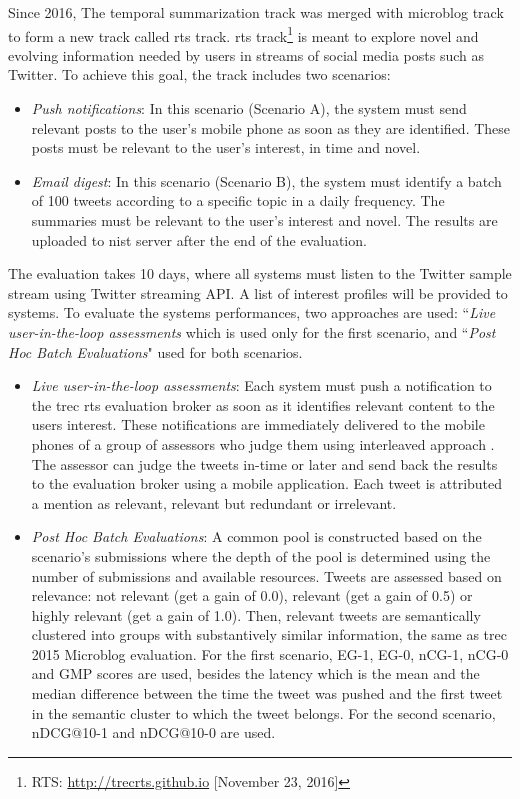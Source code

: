 Since 2016, The temporal summarization track was merged with microblog track to form a new track called \ac{rts} track.
\ac{rts} track\footnote{RTS: \url{http://trecrts.github.io} [November 23, 2016]} is meant to explore novel and evolving information needed by users in streams of social media posts such as Twitter.
To achieve this goal, the track includes two scenarios:
\begin{itemize}
	\item \textit{Push notifications}: 
	In this scenario (Scenario A), the system must send relevant posts to the user's mobile phone as soon as they are identified. 
	These posts must be relevant to the user's interest, in time and novel.
	
	\item \textit{Email digest}:
	In this scenario (Scenario B), the system must identify a batch of 100 tweets according to a specific topic in a daily frequency.
	The summaries must be relevant to the user's interest and novel.
	The results are uploaded to \ac{nist} server after the end of the evaluation.
\end{itemize}
%
The evaluation takes 10 days, where all systems must listen to the Twitter sample stream using Twitter streaming API. 
A list of interest profiles will be provided to systems.
To evaluate the systems performances, two approaches are used: ``\textit{Live user-in-the-loop assessments} which is used only for the first scenario, and ``\textit{Post Hoc Batch Evaluations}" used for both scenarios.
\begin{itemize}
	\item \textit{Live user-in-the-loop assessments}: 
	Each system must push a notification to the \ac{trec} \ac{rts} evaluation broker as soon as it identifies relevant content to the users interest. 
	These notifications are immediately delivered to the mobile phones of a group of assessors who judge them using interleaved approach \citep{16-qian-al}.
	The assessor can judge the tweets in-time or later and send back the results to the evaluation broker using a mobile application.
	Each tweet is attributed a mention as relevant, relevant but redundant or irrelevant.
	
	\item \textit{Post Hoc Batch Evaluations}:
	A common pool is constructed based on the scenario's submissions where the depth of the pool is determined using the number of submissions and available resources.
	Tweets are assessed based on relevance: not relevant (get a gain of 0.0), relevant (get a gain of 0.5) or highly relevant (get a gain of 1.0).
	Then, relevant tweets are semantically clustered into groups with substantively similar information, the same as \ac{trec} 2015 Microblog evaluation.
	For the first scenario, EG-1, EG-0, nCG-1, nCG-0 and GMP scores are used, besides the latency which is the mean and the median difference between the time the tweet was pushed	and the first tweet in the semantic cluster to which the tweet belongs. 
	For the second scenario, nDCG@10-1 and nDCG@10-0 are used.
	
\end{itemize}

